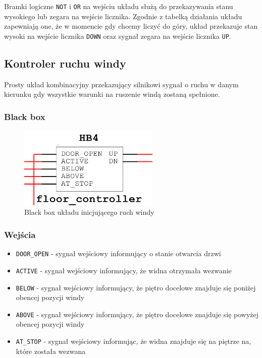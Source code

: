 \documentclass[a4paper]{article}
\begin{document}
Bramki logiczne \verb|NOT| i \verb|OR| na wejściu układu służą do przekazywania stanu wysokiego 
lub zegara na wejście licznika. Zgodnie z tabelką działania układu zapewniają one, że 
w momencie gdy chcemy liczyć do góry, układ przekazuje stan wysoki na wejście licznika \verb|DOWN|
oraz sygnał zegara na wejście licznika \verb|UP|.

\subsection{Kontroler ruchu windy}

Prosty układ kombinacyjny przekazujący silnikowi sygnał o ruchu w danym kierunku gdy wszystkie warunki
na ruszenie windą zostaną spełnione.

\subsubsection{Black box}
\begin{figure}[H]
    \centering
    \includegraphics[width=0.6\textwidth]{floor_controller.png}
    \caption{Black box układu inicjującego ruch windy}
\end{figure}

\subsubsection{Wejścia}
\begin{itemize}
    \item \verb|DOOR_OPEN| - sygnał wejściowy informujący o stanie otwarcia drzwi
    \item \verb|ACTIVE| - sygnał wejściowy informujący, że widna otrzymała wezwanie
    \item \verb|BELOW| - sygnał wejściowy informujący, że piętro docelowe znajduje się poniżej obencej pozycji windy
    \item \verb|ABOVE| - sygnał wejściowy informujący, że piętro docelowe znajduje się powyżej obencej pozycji windy
    \item \verb|AT_STOP| - sygnał wejściowy informując, że widna znajduje się na piętrze na, które została wezwana
\end{itemize}
\end{document}
